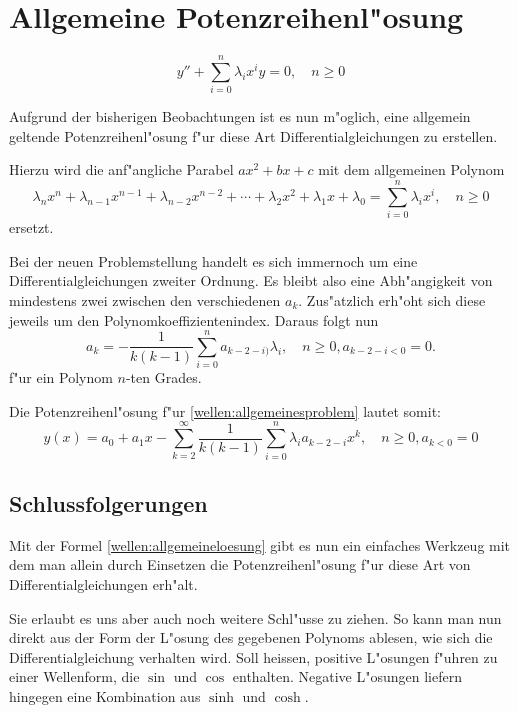 \section{Allgemeine Potenzreihenl"osung}

\begin{equation}
	y''+\sum_{i=0}^{n}\lambda_ix^i y=0, \quad n \ge 0
	\label{wellen:allgemeinesproblem}
\end{equation}

Aufgrund der bisherigen Beobachtungen ist es nun m"oglich, eine 
allgemein geltende Potenzreihenl"osung f"ur diese Art Differentialgleichungen 
zu erstellen.

Hierzu wird die anf"angliche Parabel $ax^2 + bx + c$ mit dem allgemeinen Polynom
\begin{equation*}
	\lambda_nx^n + \lambda_{n-1}x^{n-1} + \lambda_{n-2}x^{n-2} + \dotsb + 
	\lambda_2x^2 + \lambda_1x + \lambda_0 = \sum_{i=0}^{n}\lambda_ix^i, \quad n 
	\ge 0
\end{equation*}
ersetzt.

Bei der neuen Problemstellung handelt es sich immernoch um eine 
Differentialgleichungen zweiter Ordnung. Es bleibt also eine Abh"angigkeit von 
mindestens zwei zwischen den verschiedenen $a_k$. Zus"atzlich erh"oht sich 
diese jeweils um den Polynomkoeffizientenindex. Daraus folgt nun
\begin{equation*}
	a_k = -\frac{1}{k(k-1)}\sum_{i=0}^{n}a_{k-2-i)}\lambda_i, \quad n \ge 0, 
	a_{k-2-i < 0} =  0.
\end{equation*}
f"ur ein Polynom $n$-ten Grades.

Die Potenzreihenl"osung f"ur \ref{wellen:allgemeinesproblem} lautet somit:
\begin{equation}
	y(x) = a_0 + a_1x - \sum_{k=2}^{\infty}\frac{1}{k(k-1)}\sum_{i=0}^{n}
	\lambda_ia_{k-2-i}x^k, \quad n \ge 0, a_{k < 0} = 0
	\label{wellen:allgemeineloesung}
\end{equation}

\subsection{Schlussfolgerungen}

Mit der Formel \ref{wellen:allgemeineloesung} gibt es nun ein einfaches 
Werkzeug mit dem man allein durch Einsetzen die Potenzreihenl"osung f"ur 
diese Art von Differentialgleichungen erh"alt.

Sie erlaubt es uns aber auch noch weitere Schl"usse zu ziehen. So kann man 
nun direkt aus der Form der L"osung des gegebenen Polynoms ablesen, wie sich 
die Differentialgleichung verhalten wird. Soll heissen, positive L"osungen 
f"uhren zu einer Wellenform, die $\sin$ und $\cos$ enthalten. Negative 
L"osungen liefern hingegen eine Kombination aus $\sinh$ und $\cosh$.

